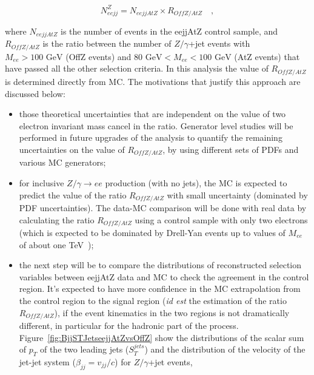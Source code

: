\begin{equation} \label{formula:NeejjZ}
N_{eejj}^{Z} = N_{eejjAtZ} \times R_{OffZ/AtZ} \quad , 
\end{equation}

where $N_{eejjAtZ}$ is the number of events in the eejjAtZ control sample, and 
$R_{OffZ/AtZ}$ is the ratio between the number of $Z/\gamma$+jet events 
with $M_{ee} > 100\mbox{ GeV}$ (OffZ events) and $80\mbox{ GeV} < M_{ee} < 100\mbox{ GeV}$ 
(AtZ events) that have passed all the other selection criteria.
In this analysis the value of $R_{OffZ/AtZ}$ is determined directly from MC.
The motivations that justify this approach are discussed below:
%
\begin{itemize}
%
\item those theoretical uncertainties that are independent 
on the value of two electron invariant mass cancel in the ratio.
Generator level studies will be performed 
in future upgrades of the analysis to quantify the
remaining uncertainties on the value of $R_{OffZ/AtZ}$, 
by using different sets of PDFs and various MC generators;
%
%
\item for inclusive $Z/\gamma \rightarrow ee$ production (with no jets), 
the MC is expected to predict the value of the ratio $R_{OffZ/AtZ}$ with small 
uncertainty (dominated by PDF uncertainties). 
The data-MC comparison will be done with real data by calculating 
the ratio $R_{OffZ/AtZ}$ using a control sample with only two electrons 
(which is expected to be dominated by Drell-Yan events 
up to values of $M_{ee}$ of about one TeV~\cite{HEEPNOTE});
%
\item the next step will be to compare the distributions of reconstructed selection 
variables between eejjAtZ data and MC to check the agreement in the control region.
It's expected to have more confidence in the MC extrapolation 
from the control region to the signal region ({\it id est} the estimation of the ratio $R_{OffZ/AtZ}$), 
if the event kinematics in the two regions is not dramatically different, in particular for the 
hadronic part of the process.
Figure~\ref{fig:BjjSTJetseejjAtZvsOffZ}
show the distributions of the scalar sum of $p_{T}$ of the two leading jets ($S_{T}^{jets}$) 
and the distribution of the velocity of the jet-jet system ($\beta_{jj} = v_{jj}/c$) 
for $Z/\gamma$+jet events, 

\end{itemize}
